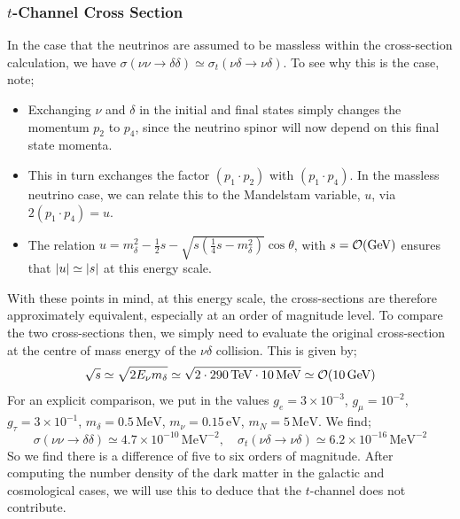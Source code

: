 \documentclass[10pt]{article}
\begin{document}
\subsubsection{$t$-Channel Cross Section}\label{sec:tchannel}
In the case that the neutrinos are assumed to be massless within the cross-section calculation, we have $\sigma(\nu\nu \rightarrow \delta\delta) \simeq \sigma_t(\nu\delta \rightarrow \nu\delta)$. To see why this is the case, note;
\begin{itemize}
  \item Exchanging $\nu$ and $\delta$ in the initial and final states simply changes the momentum $p_2$ to $p_4$, since the neutrino spinor will now depend on this final state momenta.
  \item This in turn exchanges the factor $(p_1 \cdot p_2)$ with $(p_1 \cdot p_4)$. In the massless neutrino case, we can relate this to the Mandelstam variable, $u$, via $2(p_1 \cdot p_4) = u$.
  \item The relation $u = m_\delta^2 - \tfrac{1}{2}s - \sqrt{s(\tfrac{1}{4}s - m_\delta^2)}\cos\theta$, with $s = \mathcal{O}(\textrm{GeV})$ ensures that $\left| u \right| \simeq \left| s \right|$ at this energy scale.
\end{itemize}
With these points in mind, at this energy scale, the cross-sections are therefore approximately equivalent, especially at an order of magnitude level. To compare the two cross-sections then, we simply need to evaluate the original cross-section at the centre of mass energy of the $\nu\delta$ collision. This is given by;
\begin{equation}
  \sqrt{s} \simeq \sqrt{2E_\nu m_\delta} \simeq \sqrt{2 \cdot 290 \, \textrm{TeV} \cdot 10\, \textrm{MeV}} \simeq \mathcal{O}(10 \, \textrm{GeV})
\end{equation}
For an explicit comparison, we put in the values $g_e = 3 \times 10^{-3}$, $g_\mu = 10^{-2}$, $g_\tau = 3\times 10^{-1}$, $m_\delta = 0.5 \, \textrm{MeV}$, $m_\nu = 0.15 \, \textrm{eV}$, $m_N = 5\,\textrm{MeV}$. We find;
\begin{equation}
  \sigma(\nu\nu \rightarrow \delta\delta) \simeq 4.7\times 10^{-10} \, \textrm{MeV}^{-2}, \quad \sigma_t(\nu\delta \rightarrow \nu\delta) \simeq 6.2\times 10^{-16}\, \textrm{MeV}^{-2}
\end{equation}
So we find there is a difference of five to six orders of magnitude. After computing the number density of the dark matter in the galactic and cosmological cases, we will use this to deduce that the $t$-channel does not contribute.
\end{document}

